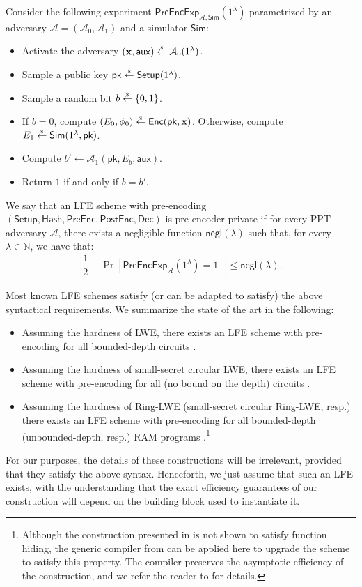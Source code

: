 \documentclass{theoretics}
\newcommand{\getsr}{\overset{\raisebox{-1pt}{$\scriptscriptstyle \$$}}{\gets}}
\newcommand{\sample}{\getsr}
\newcommand{\Pre}{\mathsf{Pre}}
\newcommand{\Post}{\mathsf{Post}}
\newcommand{\N}{\mathbb{N}}
\newcommand{\negl}{\mathsf{negl}}
\renewcommand{\sec}{\ensuremath{\lambda}}
\newcommand{\aux}{\mathsf{aux}}
\newcommand{\Sim}{\mathsf{Sim}}
\newcommand{\Adv}{\mathcal{A}}
\newcommand{\algofont}[1]{\ensuremath{\mathsf{#1}}}
\newcommand{\Enc}{{\algofont{Enc}}}
\newcommand{\Dec}{{\algofont{Dec}}}
\newcommand{\Setup}{{\algofont{Setup}}}
\newcommand{\Hash}{{\algofont{Hash}}}
\newcommand{\pk}{{\mathsf{pk}}}
\newcommand\bbbone{1}
\begin{document}
\begin{definition}
Consider the following experiment $\mathsf{PreEncExp}_{\mathcal{A}, \Sim}(\bbbone^\sec)$ parametrized by an adversary $\mathcal{A} = (\mathcal{A}_0, \mathcal{A}_1)$ and a simulator $\Sim$:
\begin{itemize}
    \item Activate the adversary $(\mathbf{x}, \aux)\sample\Adv_0(\bbbone^\sec)$.
    \item Sample a public key $\pk\sample\Setup(\bbbone^\sec)$.
    \item Sample a random bit $b\sample\{0, 1\}$. 
    \item If $b=0$, compute $(E_0, \phi_0)\sample\Enc(\pk, \mathbf{x})$. Otherwise, compute $E_1\sample\Sim(\bbbone^\sec, \pk)$.
    \item Compute $b' \gets \Adv_1(\pk, E_b, \aux)$.
    \item Return $1$ if and only if $b =b'$.
\end{itemize}
We say that an LFE scheme with pre-encoding $(\Setup, \Hash, \Pre\Enc, \Post\Enc, \Dec)$ is pre-encoder private if for every PPT adversary $\mathcal{A}$, there exists a negligible function $\negl(\sec)$ such that, for every $\sec\in\N$, we have that:
\[
\left|\frac{1}{2} - \Pr\left[\mathsf{PreEncExp}_{\mathcal{A}}(\bbbone^\sec) = 1\right] \right|\le\negl(\sec).
\]
\end{definition}
%
Most known LFE schemes satisfy (or can be adapted to satisfy) the above syntactical requirements. We summarize the state of the art in the following:
\begin{itemize}
    \item Assuming the hardness of LWE, there exists an LFE scheme with pre-encoding for all bounded-depth circuits \cite[Appendix E]{FOCS:QuaWeeWic18}.
    \item Assuming the hardness of small-secret circular LWE, there exists an LFE scheme with pre-encoding for all (no bound on the depth) circuits \cite{FOCS:HsiLinLuo23}.
    \item Assuming the hardness of Ring-LWE (small-secret circular Ring-LWE, resp.) there exists an LFE scheme with pre-encoding for all bounded-depth (unbounded-depth, resp.) RAM programs \cite{C:DHMWW24}.\footnote{{Although the construction presented in \cite{C:DHMWW24} is not shown to satisfy function hiding, the generic compiler from \cite{FOCS:QuaWeeWic18} can be applied here to upgrade the scheme to satisfy this property. The compiler preserves the asymptotic efficiency of the construction, and we refer the reader to \cite{FOCS:QuaWeeWic18} for details.}}
\end{itemize}
For our purposes, the details of these constructions will be irrelevant, provided that they satisfy the above syntax. Henceforth, we just assume that such an LFE exists, with the understanding that the exact efficiency guarantees of our construction will depend on the building block used to instantiate it.
\end{document}
